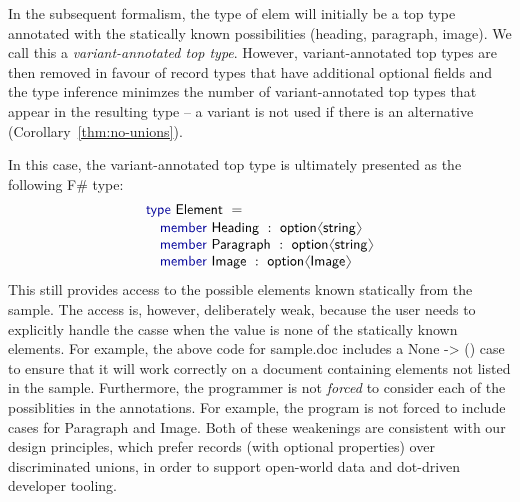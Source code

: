 \documentclass[10pt,preprint,blind,clearpagebib]{sigplanconf}
\newcommand{\langl}{\begin{picture}(4.5,7)
\put(1.1,2.5){\rotatebox{60}{\line(1,0){5.5}}}
\put(1.1,2.5){\rotatebox{300}{\line(1,0){5.5}}}
\end{picture}}
\newcommand{\rangl}{\begin{picture}(4.5,7)
\put(.9,2.5){\rotatebox{120}{\line(1,0){5.5}}}
\put(.9,2.5){\rotatebox{240}{\line(1,0){5.5}}}
\end{picture}}
\newcommand{\kvd}[1]{\textnormal{\textcolor{kvdclr}{\sffamily #1}}}
\newcommand{\strf}[1]{\textnormal{\textcolor{strclr}{\sffamily #1}}}
\newcommand{\ident}[1]{\textnormal{\sffamily #1}}
\begin{document}
In the subsequent formalism, the type of \ident{elem} will initially be a top type 
annotated with the statically known possibilities (heading, paragraph, image). 
We call this a \emph{variant-annotated top type}.
However, variant-annotated top types are then removed in favour of record types
that have additional optional fields and the type inference minimzes the number of 
variant-annotated top types that appear in the resulting type --
a variant is not used if there is an alternative (Corollary~\ref{thm:no-unions}).

In this case, the variant-annotated top type is ultimately presented as the following F\# type:
%
\begin{equation*}
\begin{array}{l}
 \kvd{type}~\ident{Element}~=  \\[0.1em]
 \quad \kvd{member}~\ident{Heading}~:~\ident{option}\langl \ident{string} \rangl\\
 \quad \kvd{member}~\ident{Paragraph}~:~\ident{option}\langl \ident{string} \rangl\\
 \quad \kvd{member}~\ident{Image}~:~\ident{option}\langl \ident{Image} \rangl\\
\end{array}
\end{equation*}
%
This still provides access to the possible elements known statically from the sample.
The access is, however, deliberately weak, because the user needs to explicitly handle the casse when the value is none 
of the statically known elements. 
For example, the above code for  \strf{sample.doc} includes a \kvd{None -> ()} case to ensure that it will work 
correctly on a document containing elements not listed in the sample. Furthermore, 
the programmer is not \emph{forced} to consider each of the possiblities in the annotations. For example,
the program is not forced to include cases for  \ident{Paragraph} and \ident{Image}.  
Both of these weakenings are consistent with our design principles, 
which prefer records (with optional properties) over discriminated unions, in order to support 
open-world data and dot-driven developer tooling.



\end{document}
